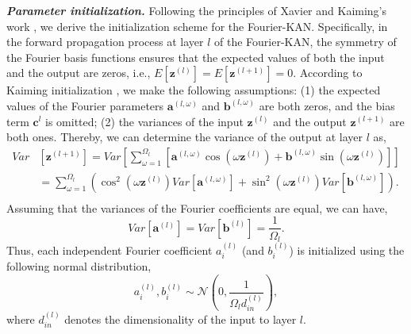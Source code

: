 \documentclass[letterpaper]{article} %
\begin{document}
\textbf{\textit{Parameter initialization.}} Following the principles of Xavier \cite{pmlr2010xavierinit} and Kaiming's work \cite{he2015kaiminginit}, we derive the initialization scheme for the Fourier-KAN. Specifically, in the forward propagation process at layer \( l \) of the Fourier-KAN, the symmetry of the Fourier basis functions ensures that the expected values of both the input and the output are zeros, i.e., \( E[\mathbf{z}^{(l)}] = E[\mathbf{z}^{(l+1)}] = 0 \). According to Kaiming initialization \cite{he2015kaiminginit}, we make the following assumptions: (1) the expected values of the Fourier parameters \(\mathbf{a}^{(l, \omega)}\) and \(\mathbf{b}^{(l, \omega)}\) are both zeros, and the bias term \(\mathbf{c}^l\) is omitted; (2) the variances of the input \(\mathbf{z}^{(l)}\)  and the output \(\mathbf{z}^{(l+1)}\) are both ones. Thereby, we can determine the variance of the output at layer \( l \) as,
\begin{equation*}
    \begin{aligned}
    Var&[\mathbf{z}^{(l+1)}] = Var[\sum_{\omega=1}^{\Omega_l} \left[ \mathbf{a}^{(l,\omega)}\cos(\omega \mathbf{z}^{(l)}) + \mathbf{b}^{(l,\omega)}\sin(\omega \mathbf{z}^{(l)})\right]] \\
    &=\sum_{\omega=1}^{\Omega_l} \left( \cos^2(\omega \mathbf{z}^{(l)})Var[\mathbf{a}^{(l, \omega)}] + \sin^2(\omega \mathbf{z}^{(l)}) Var[\mathbf{b}^{(l, \omega)}] \right). \\
    \end{aligned}
\end{equation*} Assuming that the variances of the Fourier coefficients are equal, we can have,
\begin{equation}
    Var[\mathbf{a}^{(l)}]=Var[\mathbf{b}^{(l)}]=\frac{1}{\Omega_l}. 
\end{equation}
Thus, each independent Fourier coefficient \(a_i^{(l)}\) (and \(b_i^{(l)}\)) is initialized using the following normal distribution,
\begin{equation}
    a_i^{(l)}, b_i^{(l)} \sim \mathcal{N}(0, \frac{1}{\Omega_l d_{in}^{(l)}}), 
\end{equation} where \(d_{in}^{(l)}\) denotes the dimensionality of the input to layer \( l \).
\end{document}
